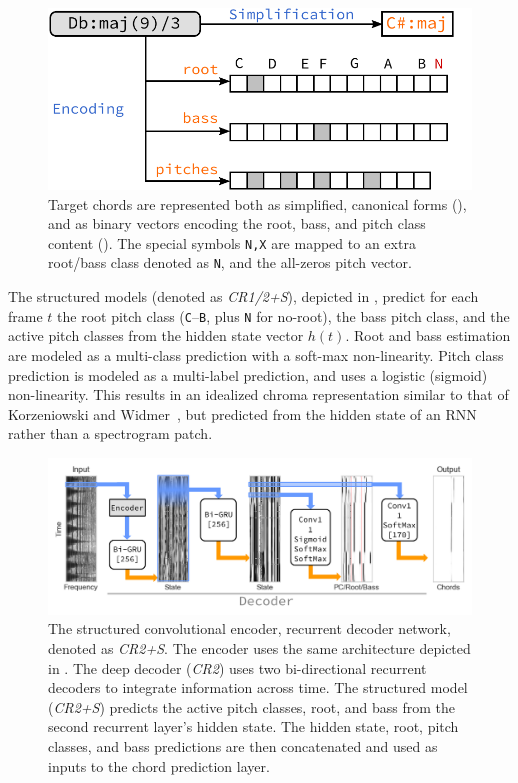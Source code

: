 \documentclass{article}
\begin{document}
\begin{figure}
    \centering
    \includegraphics[width=0.9\columnwidth]{encoding}
    \caption{Target chords are represented both as simplified, canonical forms (), and as binary vectors encoding the root, bass, and pitch class content ().
    The special symbols \texttt{N,X} are mapped to an extra root/bass class denoted as \texttt{N}, and the all-zeros pitch vector.\label{fig:encoding}}
\end{figure}

The structured models (denoted as \emph{CR1/2+S}), depicted in , predict for each frame $t$ the root pitch class (\texttt{C}--\texttt{B}, plus \texttt{N} for no-root), the bass pitch class, and the active pitch classes from the hidden state vector $h(t)$.
Root and bass estimation are modeled as a multi-class prediction with a soft-max non-linearity.
Pitch class prediction is modeled as a multi-label prediction, and uses a logistic (sigmoid) non-linearity.
This results in an idealized chroma representation similar to that of Korzeniowski and Widmer~\cite{korzeniowski2016feature}, but predicted from the hidden state of an RNN rather than a spectrogram patch.

\begin{figure}
    \centering
    \includegraphics[width=\columnwidth]{crnn2}
    \caption{The structured convolutional encoder, recurrent decoder network, denoted as \emph{CR2+S}.
    The encoder uses the same architecture depicted in .
    The deep decoder (\emph{CR2}) uses two bi-directional recurrent decoders to integrate information across time.
    The structured model (\emph{CR2+S}) predicts the active pitch classes, root, and bass from the second recurrent layer's hidden state.
    The hidden state, root, pitch classes, and bass predictions are then concatenated and used as inputs to the chord prediction layer.\label{fig:crnn2}}
\end{figure}
\end{document}
